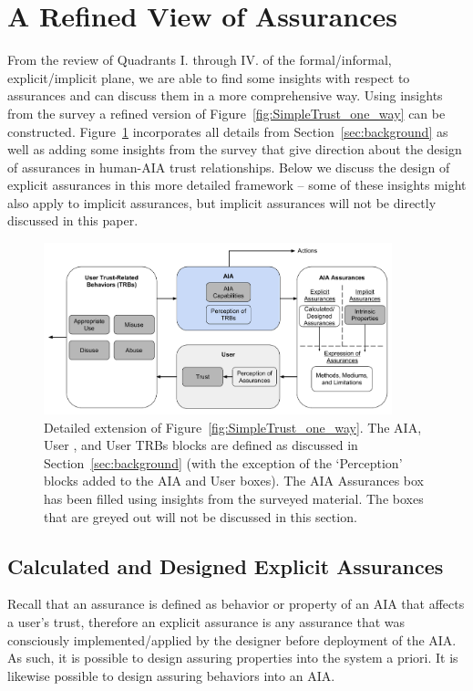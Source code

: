 \section{A Refined View of Assurances} \label{sec:synthesis}
    From the review of Quadrants I. through IV. of the formal/informal, explicit/implicit plane, we are able to find some insights with respect to assurances and can discuss them in a more comprehensive way. Using insights from the survey a refined version of Figure~\ref{fig:SimpleTrust_one_way} can be constructed. Figure~\ref{fig:refined_assurances} incorporates all details from Section~\ref{sec:background} as well as adding some insights from the survey that give direction about the design of assurances in human-AIA trust relationships. Below we discuss the design of explicit assurances in this more detailed framework -- some of these insights might also apply to implicit assurances, but implicit assurances will not be directly discussed in this paper.

    \begin{figure}[htbp]
        \centering
        \includegraphics[width=0.9\textwidth]{Figures/RefinedTrust_one_way}
        \caption{Detailed extension of Figure~\ref{fig:SimpleTrust_one_way}. The AIA, User , and User TRBs blocks are defined as discussed in Section~\ref{sec:background} (with the exception of the `Perception' blocks added to the AIA and User boxes). The AIA Assurances box has been filled using insights from the surveyed material. The boxes that are greyed out will not be discussed in this section.}
        \label{fig:refined_assurances}
    \end{figure}

\subsection{Calculated and Designed Explicit Assurances}
    Recall that an assurance is defined as  behavior or property of an AIA that affects a user's trust, therefore an explicit assurance is any assurance that was consciously implemented/applied by the designer before deployment of the AIA. As such, it is possible to design assuring properties into the system a priori. It is likewise possible to design assuring behaviors into an AIA.

